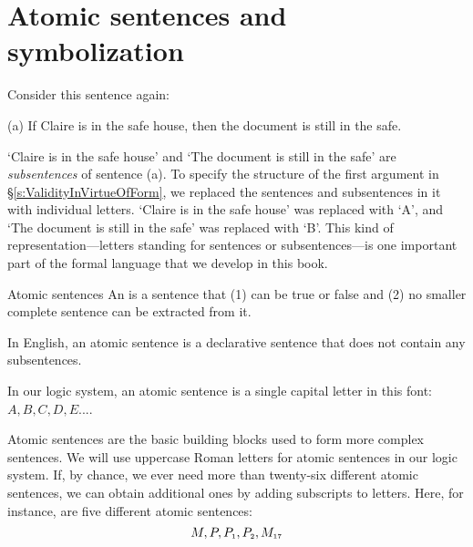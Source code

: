 
\section{Atomic sentences and symbolization}\label{s:atomic}

Consider this sentence again:
	\begin{earg}
		\item[(a)] If Claire is in the safe house, then the document is still in the safe.
	\end{earg}
`Claire is in the safe house' and `The document is still in the safe' are \textit{subsentences} of sentence (a). To specify the structure of the first argument in \S\ref{s:ValidityInVirtueOfForm}, we replaced the sentences and subsentences in it with individual letters. `Claire is in the safe house' was replaced with `A', and `The document is still in the safe' was replaced with `B'. This kind of representation---letters standing for sentences or subsentences---is one important part of the formal language that we develop in this book.

\begin{factboxy}{Atomic sentences}
An  is a sentence that (1) can be true or false and (2) no smaller complete sentence can be extracted from it.\medskip

In English, an atomic sentence is a declarative sentence that does not contain any subsentences.\smallskip

In our logic system, an atomic sentence is a single capital letter in this font: $A, B, C, D, E . . .$.
\end{factboxy}

Atomic sentences are the basic building blocks used to form more complex sentences. We will use uppercase Roman letters for atomic sentences in our logic system. If, by chance, we ever need more than twenty-six different atomic sentences, we can obtain additional ones by adding subscripts to letters. Here, for instance, are five different atomic sentences:
	$$M, P, P_{\text{\tiny 1}}, P_{\text{\tiny 2}}, M_{\text{\tiny 17}}$$

